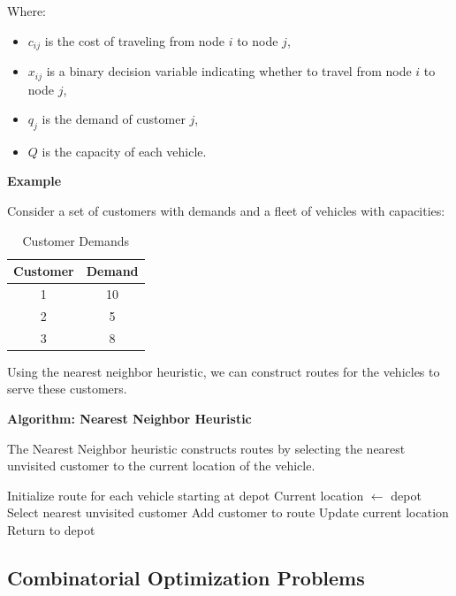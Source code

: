 \documentclass[12pt]{book} %
\begin{document}
Where:
\begin{itemize}
    \item $c_{ij}$ is the cost of traveling from node $i$ to node $j$,
    \item $x_{ij}$ is a binary decision variable indicating whether to travel from node $i$ to node $j$,
    \item $q_j$ is the demand of customer $j$,
    \item $Q$ is the capacity of each vehicle.
\end{itemize}

\textbf{Example}

Consider a set of customers with demands and a fleet of vehicles with capacities:

\begin{table}[H]
    \centering
    \begin{tabular}{|c|c|}
    \hline
    Customer & Demand \\
    \hline
    1 & 10 \\
    2 & 5 \\
    3 & 8 \\
    \hline
    \end{tabular}
    \caption{Customer Demands}
\end{table}

Using the nearest neighbor heuristic, we can construct routes for the vehicles to serve these customers.

\textbf{Algorithm: Nearest Neighbor Heuristic}

The Nearest Neighbor heuristic constructs routes by selecting the nearest unvisited customer to the current location of the vehicle.

\begin{algorithm}[H]
\caption{Nearest Neighbor Heuristic}\label{alg:nearest-neighbor}
\begin{algorithmic}[1]
    \State Initialize route for each vehicle starting at depot
        \State Current location $\gets$ depot
            \State Select nearest unvisited customer
            \State Add customer to route
            \State Update current location
        \EndWhile
        \State Return to depot
    \EndFor
\EndProcedure
\end{algorithmic}
\end{algorithm}

\subsection{Combinatorial Optimization Problems}
\end{document}
